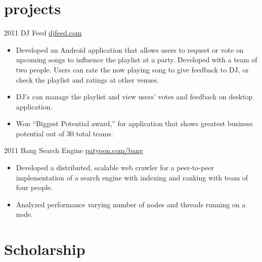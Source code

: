 \documentclass[]{patyoon-cv}
\begin{document}
\section{projects}

\begin{entrylist}
  \entry
  {2011}
  {DJ Feed}
  {\href{http://djfeed.com}{djfeed.com}}
  {\begin{itemize}
    \item Developed an Android application that allows users to request or vote on upcoming songs to influence the playlist at a party. Developed with a team of two people. Users can rate the now playing song to give feedback to DJ, or check the playlist and ratings at other venues.
    \item DJ's can manage the playlist and view users' votes and feedback on desktop application.
    \item Won “Biggest Potential award,” for application that shows greatest business potential out of 30 total teams.
    \end{itemize}
  }
  \entry
  {2011}
  {Bang Search Engine}
  {\href{http://patyoon.com/bang}{patyoon.com/bang}}
  {
    \begin{itemize}
    \item Developed a distributed, scalable web crawler for a peer-to-peer implementation of a search engine with indexing and ranking with team of four people.
    \item Analyzed performance varying number of nodes and threads running on a node.
    \end{itemize}
  }
\end{entrylist}



\section{Scholarship}
\end{document}
